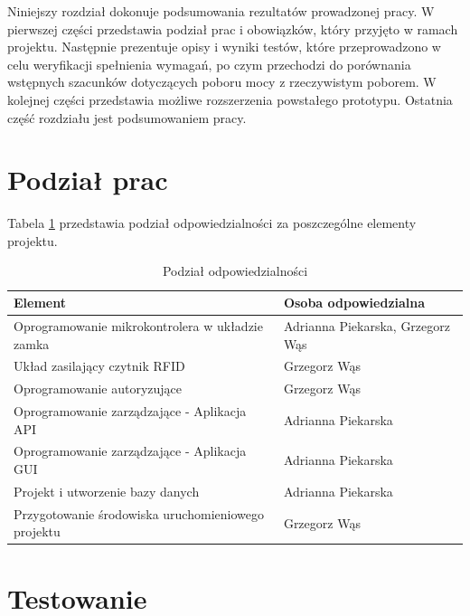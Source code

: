 \label{chap:results}

	Niniejszy rozdział dokonuje podsumowania rezultatów prowadzonej pracy. W pierwszej części przedstawia podział prac i obowiązków, który przyjęto w ramach projektu. Następnie prezentuje opisy i wyniki testów, które przeprowadzono w celu weryfikacji spełnienia wymagań, po czym przechodzi do porównania wstępnych szacunków dotyczących poboru mocy z rzeczywistym poborem. W kolejnej części przedstawia możliwe rozszerzenia powstałego prototypu. Ostatnia część rozdziału jest podsumowaniem pracy.

    \section{Podział prac}

    Tabela \ref{tbl:podzial} przedstawia podział odpowiedzialności za poszczególne elementy projektu.

     \begin{table}[]
            \caption{Podział odpowiedzialności}
            \centering
            \begin{tabular}{p{8cm}|p{4cm}}
            \textbf{Element} & \textbf{Osoba odpowiedzialna} \\ \hline
            Oprogramowanie mikrokontrolera w układzie zamka & Adrianna Piekarska, Grzegorz Wąs \\
            \hline
            Układ zasilający czytnik RFID & Grzegorz Wąs \\
            \hline
            Oprogramowanie autoryzujące & Grzegorz Wąs \\
            \hline
            Oprogramowanie zarządzające - Aplikacja API & Adrianna Piekarska \\
            \hline
            Oprogramowanie zarządzające - Aplikacja GUI & Adrianna Piekarska \\
            \hline
            Projekt i utworzenie bazy danych & Adrianna Piekarska \\
            \hline
            Przygotowanie środowiska uruchomieniowego projektu & Grzegorz Wąs \\
            \end{tabular}
            \label{tbl:podzial}
    \end{table}



    \section{Testowanie}

